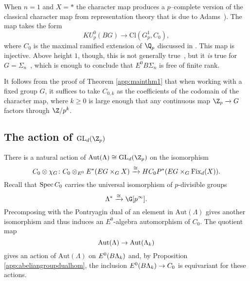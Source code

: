 


\begin{example}
When \(n=1\) and \(X = *\) the character map produces a \(p\)--complete version of the classical character map from representation theory that is due to Adams~\cite[Section 2]{AdamsClassifyingSpacesII}). The map takes the form
\[
KU_{p}^{0}(BG) \xrightarrow{} \mathrm{Cl}(G_{p}^{1}, C_0),
\]
where \(C_0\) is the maximal ramified extension of \(\Q_p\) discussed in .  This map is injective.  Above height \(1\), though, this is not generally true~\cite{Kriz}, but it \emph{is} true for $G = \Sigma_n$~\cite[Theorem 7.3]{HKR}, which is enough to conclude that $E^0 B\Sigma_n$ is free of finite rank.
\end{example}

\begin{remark}
It follows from the proof of Theorem \ref{app:mainthm1} that when working with a fixed group \(G\), it suffices to take \(C_{0,k}\) as the coefficients of the codomain of the character map, where \(k \geq 0\) is large enough that any continuous map \(\Z_p \xrightarrow{} G\) factors through \(\Z/p^k\).
\end{remark}

\subsection{The action of \(\mathrm{GL}_d(\Z_p)\)}

There is a natural action of \(\mathrm{Aut}(\Lambda) \cong \mathrm{GL}_d(\Z_p)\) on the isomorphism
\[
C_0 \otimes \chi_G \colon C_0 \otimes_{E^0} E^*(EG \times_G X) \xrightarrow{\cong} HC_{0}P^{*}(EG \times_G \operatorname{Fix}_d(X)).
\]
Recall that \(\operatorname{Spec} C_0\) carries the universal isomorphism of \(p\)-divisible groups
\[
\Lambda^* \xrightarrow{\cong} \G[p^\infty].
\]
Precomposing with the Pontryagin dual of an element in \(\mathrm{Aut}(\Lambda)\) gives another isomorphism and thus induces an \(E^0\)-algebra automorphism of \(C_0\). The quotient map
\[
\mathrm{Aut}(\Lambda) \to \mathrm{Aut}(\Lambda_k)
\]  
gives an action of \(\mathrm{Aut}(\Lambda)\) on \(E^0(B\Lambda_k)\) and, by Proposition \ref{app:abeliangroupdualhom}, the inclusion \(E^0(B\Lambda_k) \to C_0\) is equivariant for these actions.

